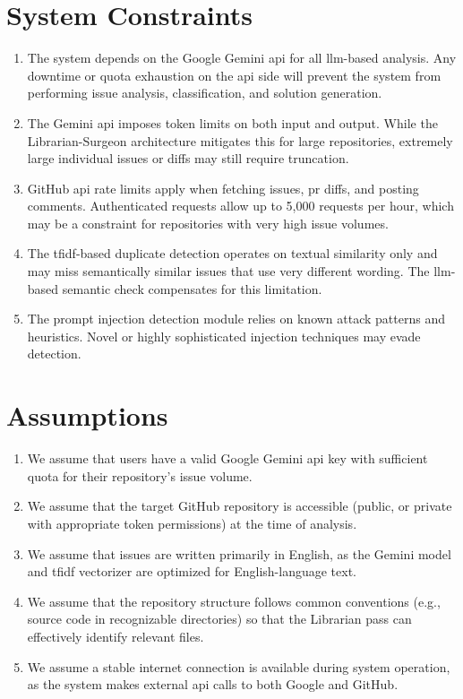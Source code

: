\section{System Constraints}

\begin{enumerate}
    \item The system depends on the Google Gemini \gls{api} for all \gls{llm}-based analysis. Any downtime or quota exhaustion on the \gls{api} side will prevent the system from performing issue analysis, classification, and solution generation.
    \item The Gemini \gls{api} imposes token limits on both input and output. While the Librarian-Surgeon architecture mitigates this for large repositories, extremely large individual issues or diffs may still require truncation.
    \item GitHub \gls{api} rate limits apply when fetching issues, \gls{pr} diffs, and posting comments. Authenticated requests allow up to 5{,}000 requests per hour, which may be a constraint for repositories with very high issue volumes.
    \item The \gls{tfidf}-based duplicate detection operates on textual similarity only and may miss semantically similar issues that use very different wording. The \gls{llm}-based semantic check compensates for this limitation.
    \item The prompt injection detection module relies on known attack patterns and heuristics. Novel or highly sophisticated injection techniques may evade detection.
\end{enumerate}

\section{Assumptions}

\begin{enumerate}
    \item We assume that users have a valid Google Gemini \gls{api} key with sufficient quota for their repository's issue volume.
    \item We assume that the target GitHub repository is accessible (public, or private with appropriate token permissions) at the time of analysis.
    \item We assume that issues are written primarily in English, as the Gemini model and \gls{tfidf} vectorizer are optimized for English-language text.
    \item We assume that the repository structure follows common conventions (e.g., source code in recognizable directories) so that the Librarian pass can effectively identify relevant files.
    \item We assume a stable internet connection is available during system operation, as the system makes external \gls{api} calls to both Google and GitHub.
\end{enumerate}

